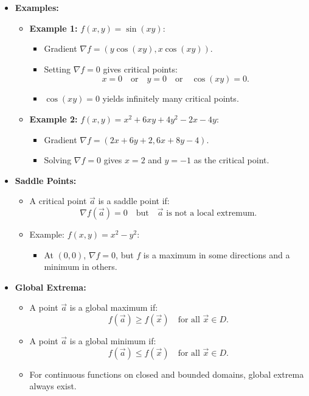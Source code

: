 \documentclass{article}
\begin{document}
\begin{itemize}
  \item \textbf{Examples:}
    \begin{itemize}
      \item \textbf{Example 1:} $f(x, y) = \sin(xy)$:
        \begin{itemize}
          \item Gradient $\nabla f = (y\cos(xy), x\cos(xy))$.
          \item Setting $\nabla f = 0$ gives critical points:
            \[
              x = 0 \quad \text{or} \quad y = 0 \quad \text{or} \quad \cos(xy) = 0.
            \]
          \item $\cos(xy) = 0$ yields infinitely many critical points.
        \end{itemize}

      \item \textbf{Example 2:} $f(x, y) = x^2 + 6xy + 4y^2 - 2x - 4y$:
        \begin{itemize}
          \item Gradient $\nabla f = (2x + 6y + 2, 6x + 8y - 4)$.
          \item Solving $\nabla f = 0$ gives $x = 2$ and $y = -1$ as the critical point.
        \end{itemize}
    \end{itemize}

  \item \textbf{Saddle Points:}
    \begin{itemize}
      \item A critical point $\vec{a}$ is a saddle point if:
        \[
          \nabla f(\vec{a}) = 0 \quad \text{but} \quad \vec{a} \text{ is not a local extremum}.
        \]
      \item Example: $f(x, y) = x^2 - y^2$:
        \begin{itemize}
          \item At $(0, 0)$, $\nabla f = 0$, but $f$ is a maximum in some directions and a minimum in others.
        \end{itemize}
    \end{itemize}

  \item \textbf{Global Extrema:}
    \begin{itemize}
      \item A point $\vec{a}$ is a global maximum if:
        \[
          f(\vec{a}) \geq f(\vec{x}) \quad \text{for all } \vec{x} \in D.
        \]
      \item A point $\vec{a}$ is a global minimum if:
        \[
          f(\vec{a}) \leq f(\vec{x}) \quad \text{for all } \vec{x} \in D.
        \]
      \item For continuous functions on closed and bounded domains, global extrema always exist.
    \end{itemize}


\end{itemize}
\end{document}
